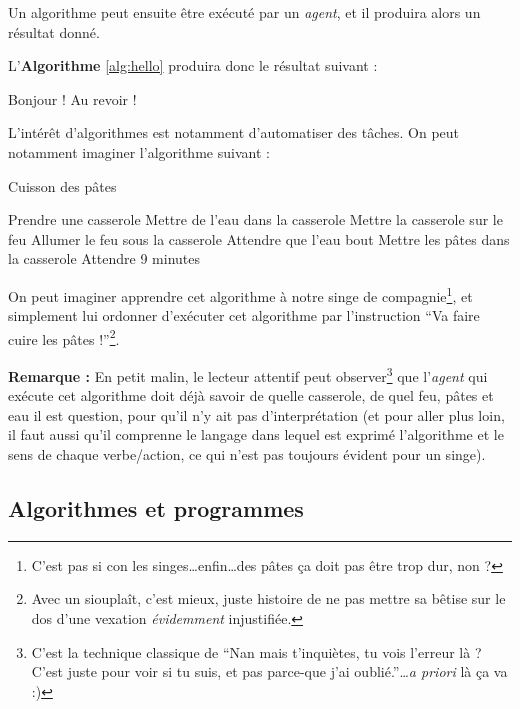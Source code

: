 \documentclass[../../main.tex]{subfiles}
\begin{document}
Un algorithme peut ensuite être exécuté par un \textit{agent}, et il produira alors un résultat donné.


L'\textbf{Algorithme }\ref{alg:hello} produira donc le résultat suivant :

\begin{minipage}{1.\textwidth} \selectfont
	Bonjour !\newline
	Au revoir !
\end{minipage}

L'intérêt d'algorithmes est notamment d'automatiser des tâches. On peut notamment imaginer l'algorithme suivant :
\newline
\begin{algorithm}
\caption{Cuisson des pâtes}\label{alg:letters}
Prendre une casserole\;
Mettre de l'eau dans la casserole\;
Mettre la casserole sur le feu\;
Allumer le feu sous la casserole\;
 {
	Attendre que l'eau bout\;
}
Mettre les pâtes dans la casserole\;
Attendre 9 minutes\;
\end{algorithm}

On peut imaginer apprendre cet algorithme à notre singe de compagnie\footnote{C'est pas si con les singes\dots enfin\dots des pâtes ça doit pas être trop dur, non ?}, et simplement lui ordonner d'exécuter cet algorithme par l'instruction ``Va faire cuire les pâtes !''\footnote{Avec un siouplaît, c'est mieux, juste histoire de ne pas mettre sa bêtise sur le dos d'une vexation \textit{évidemment} injustifiée.}.

\textbf{Remarque :} En petit malin, le lecteur attentif peut observer\footnote{C'est la technique classique de ``Nan mais t'inquiètes, tu vois l'erreur là ? C'est juste pour voir si tu suis, et pas parce-que j'ai oublié.''\dots \textit{a priori} là ça va :)} que l'\textit{agent} qui exécute cet algorithme doit déjà savoir de quelle casserole, de quel feu, pâtes et eau il est question, pour qu'il n'y ait pas d'interprétation (et pour aller plus loin, il faut aussi qu'il comprenne le langage dans lequel est exprimé l'algorithme et le sens de chaque verbe/action, ce qui n'est pas toujours évident pour un singe).
\subsection{Algorithmes et programmes} \label{sub:algorithmes_et_programmes}
\end{document}

